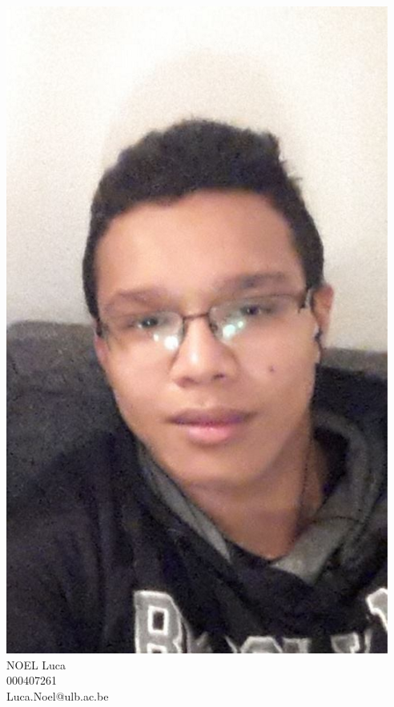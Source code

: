 \documentclass[12pt]{report}
\begin{document}
\vspace{1cm}

\begin{minipage}{0.4\textwidth}
        \begin{center} \large
        	\includegraphics[scale=0.25]{Luca.PNG}\\
            \small NOEL Luca\\
			\small 000407261\\
			\small Luca.Noel@ulb.ac.be
            \end{center}
            \end{minipage}\hfill
\end{document}
